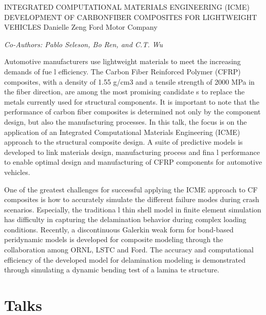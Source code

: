 \documentclass[12pt]{book}
\newenvironment{conf-abstract}[4][]{
  \needspace{10\baselineskip}
  \begin{center}
    { \renewcommand\textsuperscript[1]{}
      \phantomsection\addcontentsline{toc}{section}
      {\texorpdfstring{#2 (\emph{#3})}{#2 (#3)}}
    }
    {{\large\bfseries #2}\marginnote{#1}\par}
    \medskip
    {#3\par}
    \smallskip
    {\small #4\par}
  \end{center}
}{%
  \bigskip
  \hrule
  \bigskip
}
\newcommand{\indexauthors}[1]{%
  \forcsvlist{\index}{#1}
}
\begin{document}
\begin{conf-abstract}[26$^{th}$\\???]
{INTEGRATED  COMPUTATIONAL  MATERIALS ENGINEERING  (ICME)  DEVELOPMENT  OF CARBONFIBER COMPOSITES  FOR  LIGHTWEIGHT  VEHICLES}
{Danielle Zeng}
{Ford Motor Company}
\indexauthors{Zeng!Danielle}
\begin{center}
\textit{Co-Authors: Pablo Seleson, Bo Ren, and C.T. Wu}
\end{center}
Automotive   manufacturers  use  lightweight   materials  to  meet  the  increasing   demands  of  fue l efficiency.  The Carbon Fiber  Reinforced  Polymer  (CFRP) composites,  with  a density  of 1.55  g/cm3 and  a tensile  strength  of 2000  MPa in  the fiber  direction,  are among  the most  promising  candidate s  to  replace  the  metals  currently  used  for  structural  components.  It  is  important  to  note  that  the  performance  of  carbon  fiber  composites  is  determined  not  only  by  the  component  design,  but  also the  manufacturing   processes.  In  this   talk,   the  focus  is  on   the  application   of  an  Integrated Computational  Materials  Engineering  (ICME) approach  to  the structural  composite  design.  A suite  of  predictive   models   is  developed   to  link   materials   design,   manufacturing   process  and  fina l performance  to  enable  optimal   design  and  manufacturing   of  CFRP  components  for  automotive  vehicles.

One of the greatest challenges  for successful applying  the ICME approach  to CF composites  is  how  to  accurately simulate  the different  failure  modes  during  crash scenarios.  Especially,  the traditiona l thin  shell  model  in  finite  element  simulation  has  difficulty  in  capturing  the  delamination  behavior during  complex  loading  conditions.  Recently,  a discontinuous  Galerkin  weak form  for bond-based peridynamic  models  is developed  for composite  modeling  through  the collaboration  among  ORNL, LSTC  and   Ford.     The  accuracy  and   computational   efficiency   of  the  developed   model   for delamination   modeling   is  demonstrated  through  simulating   a dynamic  bending  test  of  a  lamina te  structure.
\end{conf-abstract}


\chapter{Talks}

{
\begin{conf-abstract}[\datum\\\tiny\time]
{\title}
{\first~ \last}
{\affiliation}
\indexauthors{\last!\first}

\end{conf-abstract}
}
\end{document}
